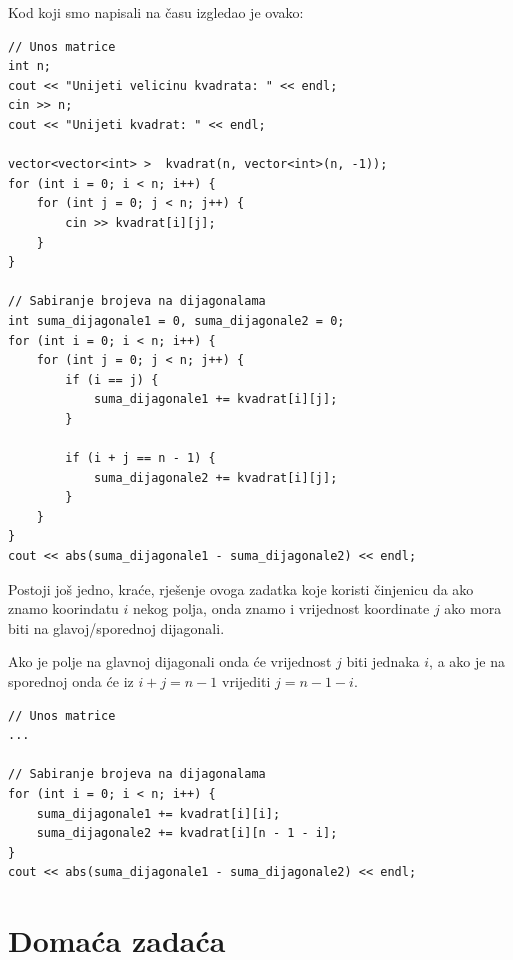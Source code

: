 \documentclass[11pt]{article}
\begin{document}
Kod koji smo napisali na času izgledao je ovako:

\begin{lstlisting}
// Unos matrice
int n;
cout << "Unijeti velicinu kvadrata: " << endl;
cin >> n;
cout << "Unijeti kvadrat: " << endl;

vector<vector<int> >  kvadrat(n, vector<int>(n, -1));
for (int i = 0; i < n; i++) {
    for (int j = 0; j < n; j++) {
        cin >> kvadrat[i][j]; 
    }
}

// Sabiranje brojeva na dijagonalama
int suma_dijagonale1 = 0, suma_dijagonale2 = 0;
for (int i = 0; i < n; i++) {
    for (int j = 0; j < n; j++) {
        if (i == j) {
            suma_dijagonale1 += kvadrat[i][j];
        }
        
        if (i + j == n - 1) {
            suma_dijagonale2 += kvadrat[i][j];
        }
    }
}
cout << abs(suma_dijagonale1 - suma_dijagonale2) << endl;
\end{lstlisting}

Postoji još jedno, kraće, rješenje ovoga zadatka koje koristi činjenicu da ako znamo koorindatu $i$ nekog polja, onda
znamo i vrijednost koordinate $j$ ako mora biti na glavoj/sporednoj dijagonali. 

Ako je polje na glavnoj dijagonali onda će vrijednost $j$ biti jednaka $i$, a ako je na sporednoj onda će iz $i + j = n - 1$ vrijediti $j = n - 1 - i$.

\begin{lstlisting}
// Unos matrice
...

// Sabiranje brojeva na dijagonalama
for (int i = 0; i < n; i++) {
    suma_dijagonale1 += kvadrat[i][i];
    suma_dijagonale2 += kvadrat[i][n - 1 - i];
}
cout << abs(suma_dijagonale1 - suma_dijagonale2) << endl;
\end{lstlisting}

\newpage

\section*{Domaća zadaća}

\vspace{0.5cm}
\end{document}
